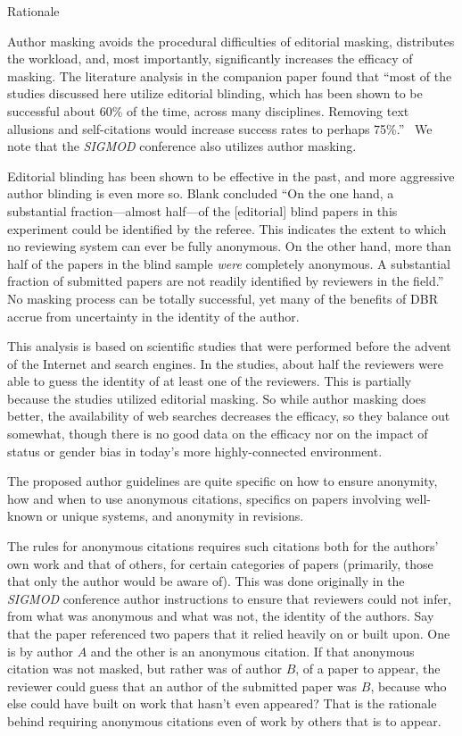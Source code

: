 \documentclass[acmtods,acmnow]{acmtrans2m}
\begin{document}
\noindent
{\sffamily Rationale}

Author masking avoids the procedural difficulties of editorial masking,
distributes the workload, and, most importantly, significantly increases the
efficacy of masking. The literature analysis in the companion paper found
that ``most of the studies discussed here utilize editorial blinding, which
has been shown to be successful about 60\% of the time, across many
disciplines. Removing text allusions and self-citations would increase
success rates to perhaps 75\%.''~\cite[page 18]{DBR} We note that the {\em
SIGMOD} conference also utilizes author masking.

Editorial blinding has been shown to be effective in the past, and more
aggressive author blinding is even more so. Blank concluded ``On the one
hand, a substantial fraction---almost half---of the [editorial] blind papers in this
experiment could be identified by the referee. This indicates the extent to
which no reviewing system can ever be fully anonymous. On the other hand,
more than half of the papers in the blind sample {\em were} completely
anonymous. A substantial fraction of submitted papers are not readily
identified by reviewers in the field.''~\cite[pp.~1051--2]{blank91} No
masking process can be totally successful, yet many of the benefits of DBR
accrue from uncertainty in the identity of the author.

This analysis is based on scientific studies that were performed before the
advent of the Internet and search engines. In the studies, about half the reviewers
were able to guess the identity of at least one of the reviewers. This is
partially because the studies utilized editorial masking. So while author
masking does better, the availability of web searches decreases the
efficacy, so they balance out somewhat, though there is no good data on the
efficacy nor on the impact of status or gender bias in today's more
highly-connected environment.

The proposed author guidelines are quite specific on how to ensure
anonymity, how and when to use anonymous citations, specifics on papers
involving well-known or unique systems, and anonymity in
revisions.

The rules for anonymous citations requires such citations both for the
authors' own work and that of others, for certain categories of papers
(primarily, those that only the author would be aware of). This was done
originally in the {\em SIGMOD} conference author instructions to ensure that
reviewers could not infer, from what was anonymous and what was not, the
identity of the
authors. Say that the paper referenced two papers that it relied
heavily on or built upon. One is by author $A$ and the other is an anonymous
citation. If that anonymous citation was not masked, but rather was of
author $B$, of a paper to appear, the reviewer could guess that an
author of the submitted paper was $B$, because who else could have built on
work that hasn't even appeared? That is the rationale behind requiring
anonymous citations even of work by others that is to appear.
\end{document}
